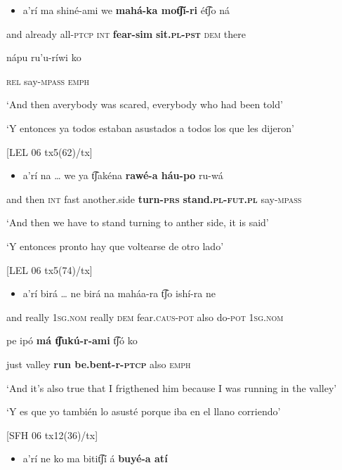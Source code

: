 \begin{itemize}
\item a’rí   ma     shiné-ami   we   \textbf{mahá-ka   mot͡ʃí-ri}   ét͡ʃo   ná 
\end{itemize}

  and   already   all-\textsc{ptcp   int} \textbf{fear-sim }\textbf{sit.\textsc{pl}}\textbf{{}-}\textbf{\textsc{pst}} \textsc{dem} there

   nápu   ru’u-ríwi   ko

\textsc{rel}   say-\textsc{mpass   emph}

‘And then averybody was scared, everybody who had been told’  

‘Y entonces ya todos estaban asustados a todos los que les dijeron’

 [LEL 06 tx5(62)/tx]  

\begin{itemize}
\item a’rí   na …  we   ya   t͡ʃakéna     \textbf{rawé-a    háu-po}        ru-wá
\end{itemize}

  and   then   \textsc{int} fast   another.side  \textbf{turn-\textsc{prs} }\textbf{stand\textsc{.pl-fut.pl}} say-\textsc{mpass}  

‘And then we have to stand turning to anther side, it is said’

‘Y entonces pronto hay que voltearse de otro lado’  

[LEL 06 tx5(74)/tx]  

\begin{itemize}
\item a’rí   birá … ne     birá   na   maháa-ra   t͡ʃo   ishí-ra   ne     
\end{itemize}

  and  really  1\textsc{sg.nom}  really  \textsc{dem} fear.\textsc{caus}{}-\textsc{pot} also  do-\textsc{pot}  1\textsc{sg.nom}

  pe   ipó   \textbf{má   t͡ʃukú-r-ami}     t͡ʃó   ko

  just  valley  \textbf{run  be.bent-r-\textsc{ptcp}} also  \textsc{emph}

  ‘And it’s also true that I frigthened him because I was running in the valley’

‘Y es que yo también lo asusté porque iba en el llano corriendo’

 [SFH 06 tx12(36)/tx]

\begin{itemize}
\item a’rí   ne       ko   ma   bitit͡ʃí   á   \textbf{buyé-a   atí}
\end{itemize}


